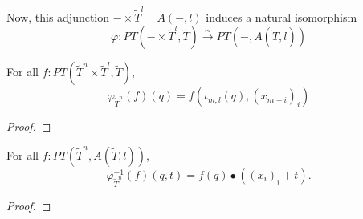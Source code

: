 Now, this adjunction $ - \times \tilde T^l \dashv A(-, l) $ induces a natural isomorphism
\[ \varphi: PT(- \times \tilde T^l, \tilde T) \xrightarrow{\sim} PT(-, A(\tilde T, l)) \]
\begin{lemma}
  For all $ f: PT(\tilde T^n \times \tilde T^l, \tilde T) $,
  \[ \varphi_{\tilde T^n}(f)(q) = f(\iota_{m, l}(q), (x_{m + i})_i) \]
\end{lemma}
\begin{proof}
  \TODO
\end{proof}

\begin{lemma}
  For all $ f: PT(\tilde T^n, A(\tilde T, l)) $,
  \[ \varphi_{\tilde T^n}^{-1}(f)(q, t) = f(q) \bullet ((x_i)_i + t). \]
\end{lemma}
\begin{proof}
  \TODO
\end{proof}


